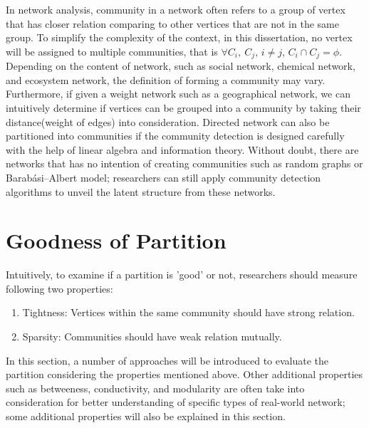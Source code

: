 \documentclass[12pt]{article}
\begin{document}
In network analysis, community in a network often refers to a group of vertex that has closer relation comparing to other vertices that are not in the same group. To simplify the complexity of the context, in this dissertation, no vertex will be assigned to multiple communities, that is $\forall C_i,\ C_j \text{, } i \neq j$, $C_i \cap C_j = \phi$. Depending on the content of network, such as social network, chemical network, and ecosystem network, the definition of forming a community may vary. Furthermore, if given a weight network such as a geographical network, we can intuitively determine if vertices can be grouped into a community by taking their distance(weight of edges) into consideration. Directed network can also be partitioned into communities if the community detection is designed carefully with the help of linear algebra and information theory\cite{4}. Without doubt, there are networks that has no intention of creating communities such as random graphs or Barabási–Albert model\cite{5}; researchers can still apply community detection algorithms to unveil the latent structure from these networks.

\section{Goodness of Partition}

Intuitively, to examine if a partition is 'good' or not, researchers should measure following two properties: 
\begin{enumerate}[label=(\alph*)]
\item Tightness: Vertices within the same community should have strong relation.
\item Sparsity: Communities should have weak relation mutually.
\end{enumerate}

In this section, a number of approaches will be introduced to evaluate the partition considering the properties mentioned above. Other additional properties such as betweeness, conductivity, and modularity are often take into consideration for better understanding of specific types of real-world network\cite{7,8}; some additional properties will also be explained in this section.
\end{document}
